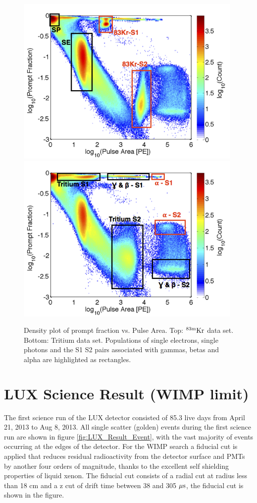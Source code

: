  \begin{figure}[h!]\centering
\includegraphics[width=110mm]{Chapter_LUX_Det/Kr_83_Density_text.png}
\includegraphics[width=110mm]{Chapter_LUX_Det/T_Density_text.png}
\caption{Density plot of prompt fraction vs. Pulse Area. Top: $\rm^{83m}Kr$ data set. Bottom: Tritium data set. Populations of single electrons, single photons and the S1 S2 pairs associated with gammas, betas and alpha are highlighted as rectangles.}
\label{fig:Prompt_Fraction}
\end{figure}


\section{LUX Science Result (WIMP limit)}

The first science run of the LUX detector consisted of 85.3 live days from April 21, 2013 to Aug 8, 2013. All single scatter (golden) events during the first science run are shown in figure \ref{fig:LUX_Result_Event}, with the vast majority of events occurring at the edges of the detector. For the WIMP search a fiducial cut is applied that reduces residual radioactivity from the detector surface and PMTs by another four orders of magnitude, thanks to the excellent self shielding properties of liquid xenon. The fiducial cut consists of a radial cut at radius less than 18 cm and a z cut of drift time between 38 and 305 $\rm \mu s$, the fiducial cut is shown in the figure.

